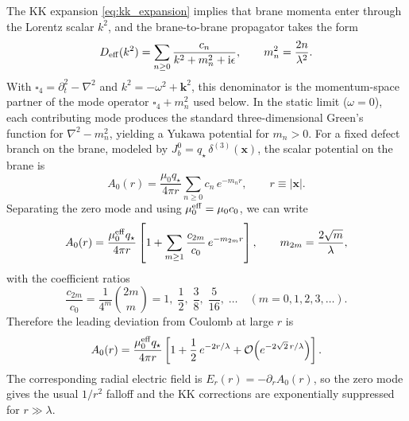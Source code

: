 \documentclass[11pt]{article}
\newcommand{\ii}{\mathrm i}
\newcommand{\J}{J}
\newcommand{\lam}{\lambda}      %
\newcommand{\qstar}{q_\star}
\newcommand{\muo}{\mu_0}
\newcommand{\mueff}{\mu_0^{\rm eff}}
\begin{document}
The KK expansion \cref{eq:kk_expansion} implies that brane momenta enter through
the Lorentz scalar \(k^2\), and the brane-to-brane propagator takes the form
\begin{equation}
  D_{\rm eff}(k^2)
  = \sum_{n\ge 0}\frac{c_n}{k^2 + m_n^2 + \ii\epsilon},
  \qquad
  m_n^2=\frac{2n}{\lam^2}.
  \label{eq:Deff_explicit}
\end{equation}
With \(\square_4=\partial_t^2-\nabla^2\) and
\(k^2=-\omega^2+\mathbf{k}^2\), this denominator is the momentum-space partner
of the mode operator \(\square_4+m_n^2\) used below. In the static limit
(\(\omega=0\)), each contributing mode produces the standard
three-dimensional Green's function for \(\nabla^2-m_n^2\), yielding a Yukawa
potential for \(m_n>0\). For a fixed defect branch on the brane, modeled by
\(\J_b^0=\qstar\,\delta^{(3)}(\mathbf x)\), the scalar potential on the brane is
\begin{equation}
  A_0(r)
  = \frac{\muo \qstar}{4\pi r}\sum_{n\ge 0} c_n\,e^{-m_n r},
  \qquad r\equiv|\mathbf x|.
  \label{eq:A0_KK_sum}
\end{equation}
Separating the zero mode and using \(\mueff=\muo c_0\), we can write
\begin{equation}
  A_0(r)
  = \frac{\mueff \qstar}{4\pi r}
    \left[
      1 + \sum_{m\ge 1}\frac{c_{2m}}{c_0}\,e^{-m_{2m} r}
    \right],
  \qquad
  m_{2m}=\frac{2\sqrt{m}}{\lam},
  \label{eq:A0_mu_eff_form}
\end{equation}
with the coefficient ratios
\begin{equation}
  \frac{c_{2m}}{c_0}
  = \frac{1}{4^m}\binom{2m}{m}
  = 1,\;\frac12,\;\frac{3}{8},\;\frac{5}{16},\;\ldots \quad (m=0,1,2,3,\ldots).
  \label{eq:ratio_cn}
\end{equation}
Therefore the leading deviation from Coulomb at large \(r\) is
\begin{equation}
  A_0(r)
  = \frac{\mueff \qstar}{4\pi r}\left[1+\frac12\,e^{-2r/\lam}
    + \mathcal{O}\!\left(e^{-2\sqrt{2}\,r/\lam}\right)\right].
  \label{eq:leading_yukawa}
\end{equation}
The corresponding radial electric field is \(E_r(r)=-\partial_r A_0(r)\), so the
zero mode gives the usual \(1/r^2\) falloff and the KK corrections are exponentially
suppressed for \(r\gg\lam\).
\end{document}
